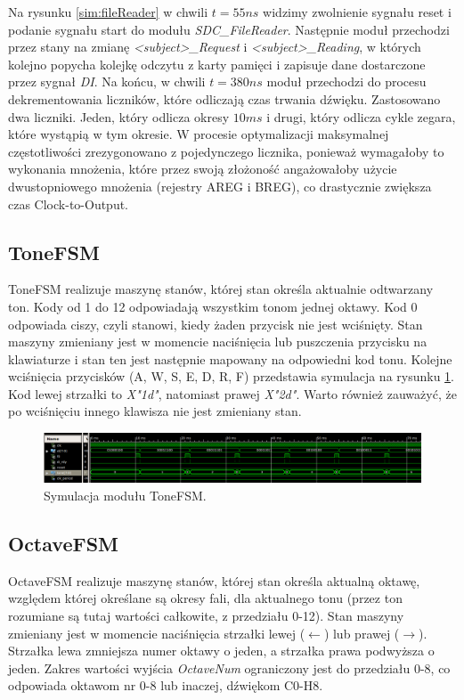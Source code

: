 \documentclass[a4paper,12pt]{article}
\begin{document}
Na rysunku \ref{sim:fileReader} w chwili $t=55ns$ widzimy zwolnienie sygnału reset i podanie sygnału start do modułu \textit{SDC\_FileReader}. Następnie moduł przechodzi przez stany na zmianę \textit{<subject>\_Request} i \textit{<subject>\_Reading}, w których kolejno popycha kolejkę odczytu z karty pamięci i zapisuje dane dostarczone przez sygnał \textit{DI}. Na końcu, w chwili $t=380ns$ moduł przechodzi do procesu dekrementowania liczników, które odliczają czas trwania dźwięku. Zastosowano dwa liczniki. Jeden, który odlicza okresy $10ms$ i drugi, który odlicza cykle zegara, które wystąpią w tym okresie. W procesie optymalizacji maksymalnej częstotliwości zrezygonowano z pojedynczego licznika, ponieważ wymagałoby to wykonania mnożenia, które przez swoją złożoność angażowałoby użycie dwustopniowego mnożenia (rejestry AREG i BREG\cite{web:datasheet}), co drastycznie zwiększa czas Clock-to-Output.



\subsection{ToneFSM}
ToneFSM realizuje maszynę stanów, której stan określa aktualnie odtwarzany ton.
Kody od 1 do 12 odpowiadają wszystkim tonom jednej oktawy. Kod 0 odpowiada ciszy, czyli stanowi, kiedy żaden przycisk nie jest wciśnięty. Stan maszyny zmieniany jest w momencie naciśnięcia lub puszczenia przycisku na klawiaturze i stan ten jest następnie mapowany na odpowiedni kod tonu. Kolejne wciśnięcia przycisków (A, W, S, E, D, R, F) przedstawia symulacja na rysunku \ref{sim:tone}. Kod lewej strzałki to \textit{X"1d"}, natomiast prawej \textit{X"2d"}. Warto również zauważyć, że po wciśnięciu innego klawisza nie jest zmieniany stan.

\begin{figure}[h]
  \centering
  \includegraphics[decodearray={1 0 1 0 1 0}, width=\linewidth]{images/tone}
  \caption{Symulacja modułu ToneFSM.}
  \label{sim:tone}
\end{figure}

\subsection{OctaveFSM}

OctaveFSM realizuje maszynę stanów, której stan określa aktualną oktawę, względem której określane są okresy fali, dla aktualnego tonu (przez ton rozumiane są tutaj wartości całkowite, z przedziału 0-12). Stan maszyny zmieniany jest w momencie naciśnięcia strzałki lewej ($\leftarrow$) lub prawej ($\rightarrow$). Strzałka lewa zmniejsza numer oktawy o jeden, a strzałka prawa podwyższa o jeden. Zakres wartości wyjścia \textit{OctaveNum} ograniczony jest do przedziału 0-8, co odpowiada oktawom nr 0-8 lub inaczej, dźwiękom C0-H8. 
\end{document}
